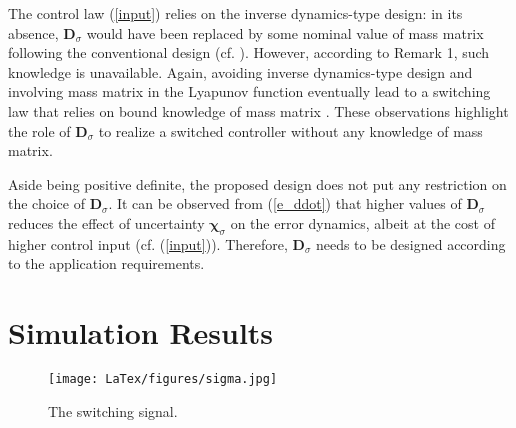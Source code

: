 \begin{remark}\label{select_d}
	The control law (\ref{input}) relies on the inverse dynamics-type design: in its absence, $\mathbf D_\sigma$ would have been replaced by some nominal value of mass matrix following the conventional design (cf. \cite{roy2019simultaneous,roy2019overcoming}). However, according to Remark 1, such knowledge is unavailable. Again, avoiding inverse dynamics-type design and involving mass matrix in the Lyapunov function eventually lead to a switching law that relies on bound knowledge of mass matrix \cite{roy2019reduced}. These observations highlight the role of $\mathbf D_\sigma$ to realize a switched controller without any knowledge of mass matrix.
	
	Aside being positive definite, the proposed design does not put any restriction on the choice of $\mathbf{D}_\sigma$. It can be observed from (\ref{e_ddot}) that higher values of $\mathbf{D}_\sigma$ reduces the effect of uncertainty $\boldsymbol \chi_\sigma$ on the error dynamics, albeit at the cost of higher control input (cf. (\ref{input})). Therefore, $\mathbf{D}_\sigma$ needs to be designed according to the application requirements. 
\end{remark}
\section{Simulation Results}
\begin{figure}[!t]
	\centering
	\texttt{[image: LaTex/figures/sigma.jpg]}%
	\caption{{The switching signal.}}\label{fig:1} %
\end{figure}

